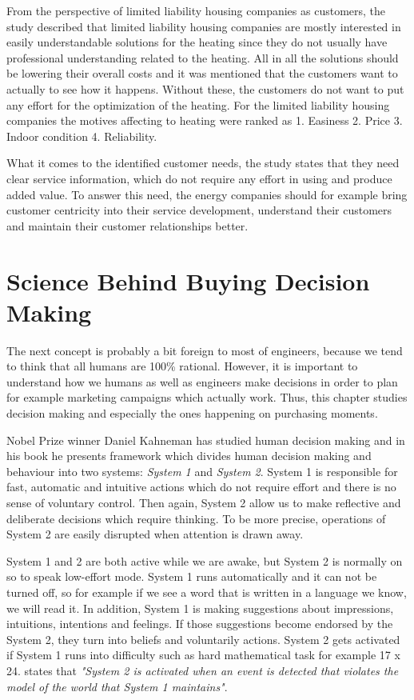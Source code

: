 From the perspective of limited liability housing companies as customers, the study \parencite{Deloitte} described that limited liability housing companies are mostly interested in easily understandable solutions for the heating since they do not usually have professional understanding related to the heating. All in all the solutions should be lowering their overall costs and it was mentioned that the customers want to actually to see how it happens. Without these, the customers do not want to put any effort for the optimization of the heating. For the limited liability housing companies the motives affecting to heating were ranked as 1. Easiness 2. Price 3. Indoor condition 4. Reliability.

What it comes to the identified customer needs, the study \parencite{Deloitte} states that they need clear service information, which do not require any effort in using and produce added value. To answer this need, the energy companies should for example bring customer centricity into their service development, understand their customers and maintain their customer relationships better.


\section{Science Behind Buying Decision Making }

The next concept is probably a bit foreign to most of engineers, because we tend to think that all humans are 100\% rational. However, it is important to understand how we humans as well as engineers make decisions in order to plan for example marketing campaigns which actually work. Thus, this chapter studies decision making and especially the ones happening on purchasing moments.

Nobel Prize winner Daniel Kahneman has studied human decision making and in his book  he presents framework which divides human decision making and behaviour into two systems: \emph{System 1} and \emph{System 2}. System 1 is responsible for fast, automatic and intuitive actions which do not require effort and  there is no sense of voluntary control. Then again, System 2 allow us to make reflective and deliberate decisions which require thinking. To be more precise, operations of System 2 are easily disrupted when attention is drawn away.

System 1 and 2 are both active while we are awake, but System 2 is normally on so to speak low-effort mode. System 1 runs automatically and it can not be turned off, so for example if we see a word that is written in a language we know, we will read it. In addition, System 1 is making suggestions about impressions, intuitions, intentions and feelings. If those suggestions become endorsed by the System 2, they turn into beliefs and voluntarily actions. System 2 gets activated if System 1 runs into difficulty such as hard mathematical task for example 17 x 24. \textcite{Kahneman:2011} states that \emph{"System 2 is activated when an event is detected that violates the model of the world that System 1 maintains"}.

